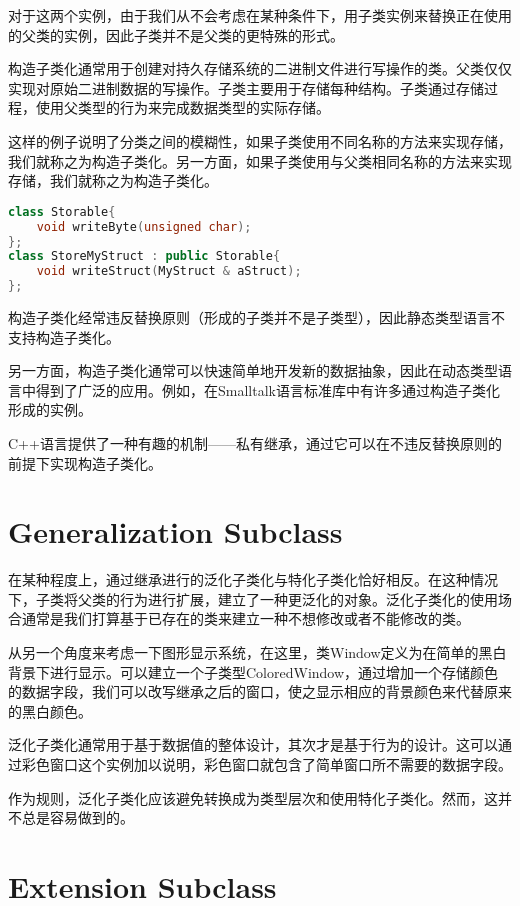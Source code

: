 对于这两个实例，由于我们从不会考虑在某种条件下，用子类实例来替换正在使用的父类的实例，因此子类并不是父类的更特殊的形式。

构造子类化通常用于创建对持久存储系统的二进制文件进行写操作的类。父类仅仅实现对原始二进制数据的写操作。子类主要用于存储每种结构。子类通过存储过程，使用父类型的行为来完成数据类型的实际存储。

这样的例子说明了分类之间的模糊性，如果子类使用不同名称的方法来实现存储，我们就称之为构造子类化。另一方面，如果子类使用与父类相同名称的方法来实现存储，我们就称之为构造子类化。

\begin{lstlisting}[language=C++]
class Storable{
	void writeByte(unsigned char);
};
class StoreMyStruct : public Storable{
	void writeStruct(MyStruct & aStruct);
};
\end{lstlisting}

构造子类化经常违反替换原则（形成的子类并不是子类型），因此静态类型语言不支持构造子类化。

另一方面，构造子类化通常可以快速简单地开发新的数据抽象，因此在动态类型语言中得到了广泛的应用。例如，在Smalltalk语言标准库中有许多通过构造子类化形成的实例。

C++语言提供了一种有趣的机制——私有继承，通过它可以在不违反替换原则的前提下实现构造子类化。

\section{Generalization Subclass}

在某种程度上，通过继承进行的泛化子类化与特化子类化恰好相反。在这种情况下，子类将父类的行为进行扩展，建立了一种更泛化的对象。泛化子类化的使用场合通常是我们打算基于已存在的类来建立一种不想修改或者不能修改的类。

从另一个角度来考虑一下图形显示系统，在这里，类Window定义为在简单的黑白背景下进行显示。可以建立一个子类型ColoredWindow，通过增加一个存储颜色的数据字段，我们可以改写继承之后的窗口，使之显示相应的背景颜色来代替原来的黑白颜色。

泛化子类化通常用于基于数据值的整体设计，其次才是基于行为的设计。这可以通过彩色窗口这个实例加以说明，彩色窗口就包含了简单窗口所不需要的数据字段。

作为规则，泛化子类化应该避免转换成为类型层次和使用特化子类化。然而，这并不总是容易做到的。



\section{Extension Subclass}


